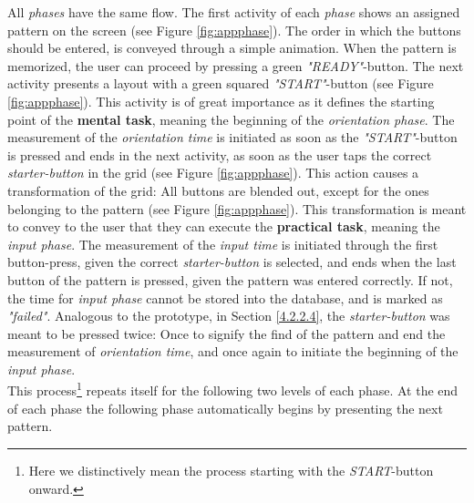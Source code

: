 All \textit{phases} have the same flow. The first activity of each \textit{phase} shows an assigned pattern on the screen (see Figure \ref{fig:appphase}). The order in which the buttons should be entered, is conveyed through a simple animation. When the pattern is memorized, the user can proceed by pressing a green \textit{"READY"}-button. The next activity presents a layout with a green squared \textit{"START"}-button (see Figure \ref{fig:appphase}). This activity is of great importance as it defines the starting point of the \textbf{mental task}, meaning the beginning of the \textit{orientation phase}. The measurement of the \textit{orientation time} is initiated as soon as the \textit{"START"}-button is pressed and ends in the next activity, as soon as the user taps the correct \textit{starter-button} in the grid (see Figure \ref{fig:appphase}). This action causes a transformation of the grid: All buttons are blended out, except for the ones belonging to the pattern (see Figure \ref{fig:appphase}). This transformation is meant to convey to the user that they can execute the \textbf{practical task}, meaning the \textit{input phase}. The measurement of the \textit{input time} is initiated through the first button-press, given the correct \textit{starter-button} is selected, and ends when the last button of the pattern is pressed, given the pattern was entered correctly. If not, the time for \textit{input phase} cannot be stored into the database, and is marked as \textit{"failed"}. Analogous to the prototype, in Section \ref{4.2.2.4}, the \textit{starter-button} was meant to be pressed twice: Once to signify the find of the pattern and end the measurement of \textit{orientation time}, and once again to initiate the beginning of the \textit{input phase}. \\

This process\footnote{Here we distinctively mean the process starting with the \textit{START}-button onward.} repeats itself for the following two levels of each phase. At the end of each phase the following phase automatically begins by presenting the next pattern.

